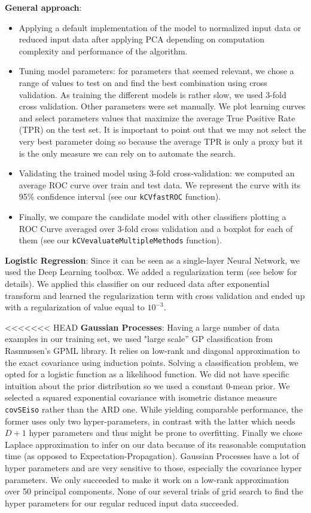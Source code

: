 \documentclass{article}
\begin{document}
  \textbf{General approach}:
   	\begin{itemize}
	   	\item Applying a default implementation of the model to normalized input data or reduced input data after applying PCA depending on computation complexity and performance of the algorithm.
    		\item Tuning model parameters: for parameters that seemed relevant, we chose a range of values to test on and find the best combination using cross validation. As training the different models is rather slow, we used 3-fold cross validation. Other parameters were set manually. We plot learning curves and select parameters values that maximize the average True Positive Rate (TPR) on the test set. It is important to point out that we may not select the very best parameter doing so because the average TPR is only a proxy but it is the only measure we can rely on to automate the search.
		  \item Validating the trained model using 3-fold cross-validation: we computed an average ROC curve over train and test data. We represent the curve with its 95\% confidence interval (see our \texttt{kCVfastROC} function).
  		\item Finally, we compare the candidate model with other classifiers plotting a ROC Curve averaged over 3-fold cross validation and a boxplot for each of them (see our \texttt{kCVevaluateMultipleMethods} function).
	\end{itemize}

  \textbf{Logistic Regression}: Since it can be seen as a single-layer Neural Network, we used the Deep Learning toolbox. We added a regularization term (see below for details). We applied this classifier on our reduced data after exponential transform and learned the regularization term with cross validation and ended up with a regularization of value equal to $10^{-3}$.

<<<<<<< HEAD
  \textbf{Gaussian Processes}: Having a large number of data examples in our training set, we used "large scale'' GP classification from Rasmussen's GPML library. It relies on low-rank and diagonal approximation to the exact covariance using induction points. Solving a classification problem, we opted for a logistic function as a likelihood function. We did not have specific intuition about the prior distribution so we used a constant 0-mean prior. We selected a squared exponential covariance with isometric distance measure \texttt{covSEiso} rather than the ARD one. While yielding comparable performance, the former uses only two hyper-parameters, in contrast with the latter which needs $D+1$ hyper parameters and thus might be prone to overfitting. Finally we chose Laplace approximation to infer on our data because of its reasonable computation time (as opposed to Expectation-Propagation). Gaussian Processes have a lot of hyper parameters and are very sensitive to those, especially the covariance hyper parameters. We only succeeded to make it work on a low-rank approximation over 50 principal components. None of our several trials of grid search to find the hyper parameters for our regular reduced input data succeeded.
  
\end{document}

